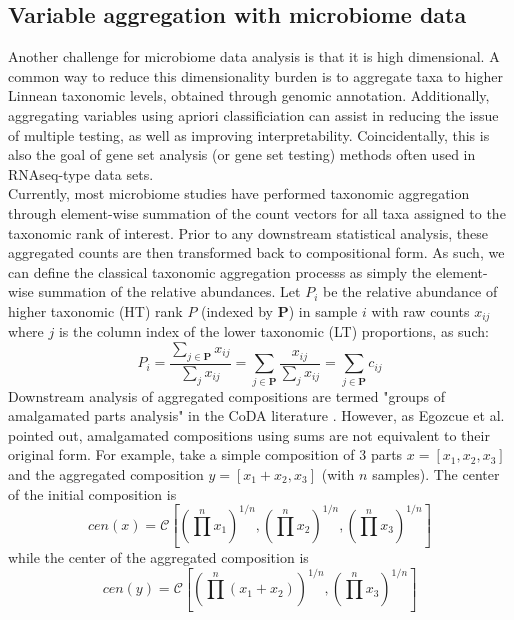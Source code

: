 \documentclass{article}
\begin{document}
 \subsection{Variable aggregation with microbiome data} 
 Another challenge for microbiome data analysis is that it is high dimensional. A common way to reduce this dimensionality burden is to aggregate taxa to higher Linnean taxonomic levels, obtained through genomic annotation. Additionally, aggregating variables using apriori classificiation can assist in reducing the issue of multiple testing, as well as improving interpretability. Coincidentally, this is also the goal of gene set analysis (or gene set testing) methods often used in RNAseq-type data sets.  \\
 Currently, most microbiome studies have performed taxonomic aggregation through element-wise summation of the count vectors for all taxa assigned to the taxonomic rank of interest. Prior to any downstream statistical analysis, these aggregated counts are then transformed back to compositional form. As such, we can define the classical taxonomic aggregation processs as simply the element-wise summation of the relative abundances. Let $P_{i}$ be the relative abundance of higher taxonomic (HT) rank $P$ (indexed by $\bm{P}$) in sample $i$ with raw counts $x_{ij}$ where $j$ is the column index of the lower taxonomic (LT) proportions, as such:
\begin{equation}
P_{i} =\frac{\sum_{j \in \bm{P}} x_{ij}}{\sum_j x_{ij}} = \sum_{j \in \bm{P}} \frac{x_{ij}}{\sum_j x_{ij}} = \sum_{j \in \bm{P}} c_{ij}
\end{equation}
\noindent Downstream analysis of aggregated compositions are termed "groups of amalgamated parts analysis" in the CoDA literature \cite{egozcue2005}. However, as Egozcue et al. \cite{egozcue2005} pointed out, amalgamated compositions using sums are not equivalent to their original form. For example, take a simple composition of 3 parts $x = [x_1, x_2, x_3]$ and the aggregated composition $y = [x_1 + x_2, x_3]$ (with $n$ samples). The center \cite{aitchison} of the initial composition is 
\[cen(x) = \mathcal{C}\left[ (\prod^n x_1)^{1/n}, (\prod^n x_2)^{1/n}, (\prod^n x_3)^{1/n} \right]\]
while the center of the aggregated composition is 
\[cen(y) = \mathcal{C}\left[ (\prod^n (x_1 + x_2))^{1/n}, (\prod^n x_3)^{1/n} \right]\]
\end{document}
